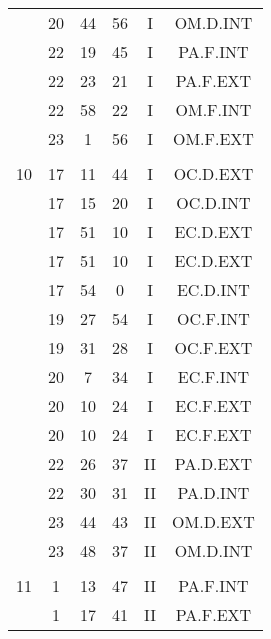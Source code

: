 \documentclass[12pt, a4paper]{article}
\begin{document}
\begin{multicols}{3}
{\begin{tabular}{c c c c c c}
	 	 	 	 & 20 & 44 & 56 & I & OM.D.INT\\%
	 	 	 	 & 22 & 19 & 45 & I & PA.F.INT\\%
	 	 	 	 & 22 & 23 & 21 & I & PA.F.EXT\\%
	 	 	 	 & 22 & 58 & 22 & I & OM.F.INT\\%
	 	 	 	 & 23 & 1 & 56 & I & OM.F.EXT\\%
	 	 	 	 & & & & & \\%
	 	 	 	10 & 17 & 11 & 44 & I & OC.D.EXT\\%
	 	 	 	 & 17 & 15 & 20 & I & OC.D.INT\\%
	 	 	 	 & 17 & 51 & 10 & I & EC.D.EXT\\%
	 	 	 	 & 17 & 51 & 10 & I & EC.D.EXT\\%
	 	 	 	 & 17 & 54 & 0 & I & EC.D.INT\\%
	 	 	 	 & 19 & 27 & 54 & I & OC.F.INT\\%
	 	 	 	 & 19 & 31 & 28 & I & OC.F.EXT\\%
	 	 	 	 & 20 & 7 & 34 & I & EC.F.INT\\%
	 	 	 	 & 20 & 10 & 24 & I & EC.F.EXT\\%
	 	 	 	 & 20 & 10 & 24 & I & EC.F.EXT\\%
	 	 	 	 & 22 & 26 & 37 & II & PA.D.EXT\\%
	 	 	 	 & 22 & 30 & 31 & II & PA.D.INT\\%
	 	 	 	 & 23 & 44 & 43 & II & OM.D.EXT\\%
	 	 	 	 & 23 & 48 & 37 & II & OM.D.INT\\%
	 	 	 	 & & & & & \\%
	 	 	 	11 & 1 & 13 & 47 & II & PA.F.INT\\%
	 	 	 	 & 1 & 17 & 41 & II & PA.F.EXT\\%

\end{tabular}}
\end{multicols}
\end{document}
